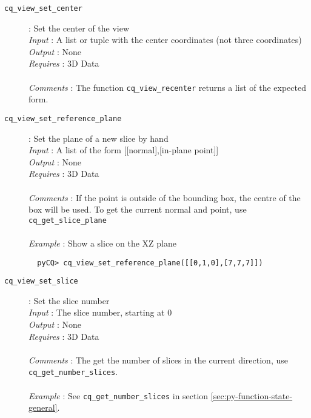 \documentclass[a4paper,notitlepage,11pt]{article}
\begin{document}
\begin{description}
\item[\texttt{cq\_view\_set\_center}]: Set the center of the view \\
  \emph{Input} : A list or tuple with the center coordinates (not three coordinates)\\
  \emph{Output} : None\\
  \emph{Requires} : 3D Data\\
  \\
  \emph{Comments} : The function \texttt{cq\_view\_recenter} returns a list of the expected form.
\end{description}

\begin{description}
\item[\texttt{cq\_view\_set\_reference\_plane}]: Set the plane of a new slice by hand\\
  \emph{Input} : A list of the form [[normal],[in-plane point]]\\
  \emph{Output} : None\\
  \emph{Requires} : 3D Data\\
  \\
  \emph{Comments} : If the point is outside of the bounding box, the centre of the box will be used.
  To get the current normal and point, use \texttt{cq\_get\_slice\_plane}\\
  \\
  \emph{Example} : Show a slice on the XZ plane
  \begin{verbatim}
  pyCQ> cq_view_set_reference_plane([[0,1,0],[7,7,7]])
  \end{verbatim}
\end{description}

\begin{description}
\item[\texttt{cq\_view\_set\_slice}]: Set the slice number \\
  \emph{Input} : The slice number, starting at 0\\
  \emph{Output} : None\\
  \emph{Requires} : 3D Data\\
  \\
  \emph{Comments} : The get the number of slices in the current direction, use \texttt{cq\_get\_number\_slices}.\\
  \\
  \emph{Example} : See \texttt{cq\_get\_number\_slices} in section \ref{sec:py-function-state-general}.
\end{description}
\end{document}
